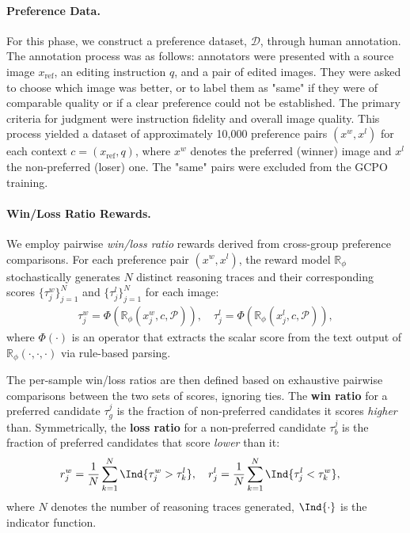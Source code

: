 \paragraph{Preference Data.}
For this phase, we construct a preference dataset, $\mathcal{D}$, through human annotation. The annotation process was as follows: annotators were presented with a source image $x_{\mathrm{ref}}$, an editing instruction $q$, and a pair of edited images. They were asked to choose which image was better, or to label them as "same" if they were of comparable quality or if a clear preference could not be established. The primary criteria for judgment were instruction fidelity and overall image quality. This process yielded a dataset of approximately 10,000 preference pairs $(x^w, x^l)$ for each context $c=(x_{\mathrm{ref}}, q)$, where $x^w$ denotes the preferred (winner) image and $x^l$ the non-preferred (loser) one. The "same" pairs were excluded from the GCPO training.


\paragraph{Win/Loss Ratio Rewards.}
We employ pairwise \emph{win/loss ratio} rewards derived from cross-group preference comparisons. 
For each preference pair $(x^w, x^l)$, the reward model $\mathbb{R}_\phi$ stochastically generates $N$ distinct reasoning traces and their corresponding scores $\{\tau_j^w\}_{j=1}^{N}$ and $\{\tau^l_j\}_{j=1}^{N}$ for each image:
\begin{align}
 \tau_j^w = \Phi\!\left(\mathbb{R}_\phi(x^w_j,c,\mathcal{P})\right), \quad \tau^l_j = \Phi\!\left(\mathbb{R}_\phi(x^l_j,c,\mathcal{P})\right),
\end{align}
where $\Phi(\cdot)$  is an operator that extracts the scalar score from the text output of $\mathbb{R}_\phi(\cdot,\cdot,\cdot)$ via rule-based parsing.

The per-sample win/loss ratios are then defined based on exhaustive pairwise comparisons between the two sets of scores, ignoring ties. The \textbf{win ratio} for a preferred candidate $\tau_g^j$ is the fraction of non-preferred candidates it scores \emph{higher} than. Symmetrically, the \textbf{loss ratio} for a non-preferred candidate $\tau_b^j$ is the fraction of preferred candidates that score \emph{lower} than it:
\begin{align}
r^w_j &= \frac{1}{N}\sum_{k=1}^{N} \Ind{\tau^w_j > \tau^l_k},\quad r^l_j = \frac{1}{N}\sum_{k=1}^{N} \Ind{\tau^l_j < \tau^w_k},
\end{align}
where $N$ denotes the number of reasoning traces generated, $\Ind{\cdot}$ is the indicator function.

